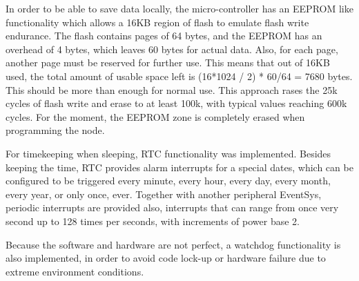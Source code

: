 In order to be able to save data locally, the micro-controller has an EEPROM like functionality which allows a 16KB region of flash to emulate flash write endurance. The flash contains pages of 64 bytes, and the EEPROM has an overhead of 4 bytes, which leaves 60 bytes for actual data. Also, for each page, another page must be reserved for further use. This means that out of 16KB used, the total amount of usable space left is (16*1024 / 2) * 60/64 = 7680 bytes. This should be more than enough for normal use. This approach rases the 25k cycles of flash write and erase to at least 100k, with typical values reaching 600k cycles.  For the moment, the EEPROM zone is completely erased when programming the node.

For timekeeping when sleeping, RTC functionality was implemented. Besides keeping the time, RTC provides alarm interrupts for a special dates, which can be configured to be triggered every minute, every hour, every day, every month, every year, or only once, ever. Together with another peripheral EventSys, periodic interrupts are provided also, interrupts that can range from once very second up to 128 times per seconds, with increments of power base 2.

Because the software and hardware are not perfect, a watchdog functionality is also implemented, in order to avoid code lock-up or hardware failure due to extreme environment conditions.

